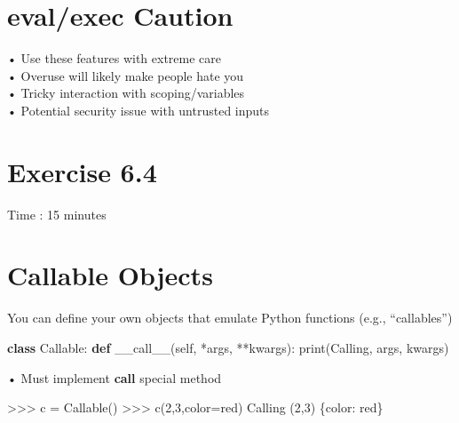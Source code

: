 \documentclass[
  letterpaper,
  DIV=11,
  numbers=noendperiod]{scrreprt}
\newenvironment{Shaded}{\begin{snugshade}}{\end{snugshade}}
\newcommand{\BuiltInTok}[1]{\textcolor[rgb]{0.00,0.23,0.31}{#1}}
\newcommand{\DecValTok}[1]{\textcolor[rgb]{0.68,0.00,0.00}{#1}}
\newcommand{\FunctionTok}[1]{\textcolor[rgb]{0.28,0.35,0.67}{#1}}
\newcommand{\KeywordTok}[1]{\textcolor[rgb]{0.00,0.23,0.31}{\textbf{#1}}}
\newcommand{\NormalTok}[1]{\textcolor[rgb]{0.00,0.23,0.31}{#1}}
\newcommand{\OperatorTok}[1]{\textcolor[rgb]{0.37,0.37,0.37}{#1}}
\newcommand{\StringTok}[1]{\textcolor[rgb]{0.13,0.47,0.30}{#1}}
\newcommand{\VariableTok}[1]{\textcolor[rgb]{0.07,0.07,0.07}{#1}}
\begin{document}

\chapter{eval/exec Caution}\label{evalexec-caution}

• Use these features with extreme care\\
• Overuse will likely make people hate you\\
• Tricky interaction with scoping/variables\\
• Potential security issue with untrusted inputs


\chapter{Exercise 6.4}\label{exercise-6.4}

Time : 15 minutes


\chapter{Callable Objects}\label{callable-objects}

You can define your own objects that emulate Python functions (e.g.,
``callables'')

\begin{Shaded}
\begin{Highlighting}[]
\KeywordTok{class}\NormalTok{ Callable: }\KeywordTok{def} \FunctionTok{\_\_call\_\_}\NormalTok{(}\VariableTok{self}\NormalTok{, }\OperatorTok{*}\NormalTok{args, }\OperatorTok{**}\NormalTok{kwargs): }\BuiltInTok{print}\NormalTok{(}\StringTok{\textquotesingle{}Calling\textquotesingle{}}\NormalTok{, args, kwargs) }
\end{Highlighting}
\end{Shaded}

• Must implement \textbf{call} special method

\begin{Shaded}
\begin{Highlighting}[]
\OperatorTok{\textgreater{}\textgreater{}\textgreater{}}\NormalTok{ c }\OperatorTok{=}\NormalTok{ Callable()}
\OperatorTok{\textgreater{}\textgreater{}\textgreater{}}\NormalTok{ c(}\DecValTok{2}\NormalTok{,}\DecValTok{3}\NormalTok{,color}\OperatorTok{=}\StringTok{\textquotesingle{}red\textquotesingle{}}\NormalTok{)}
\NormalTok{Calling (}\DecValTok{2}\NormalTok{,}\DecValTok{3}\NormalTok{) \{}\StringTok{\textquotesingle{}color\textquotesingle{}}\NormalTok{: }\StringTok{\textquotesingle{}red\textquotesingle{}}\NormalTok{\} }
\end{Highlighting}
\end{Shaded}
\end{document}
